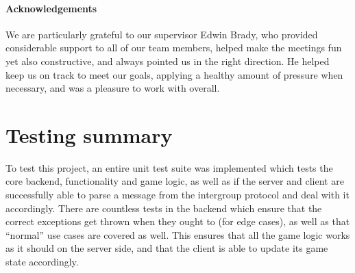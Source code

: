 \documentclass[a4paper,doc]{apa6}
\begin{document}
\begin{appendices}

\paragraph{Acknowledgements}
We are particularly grateful to our supervisor Edwin Brady, who provided considerable support to all of our team members, helped make the meetings fun yet also constructive, and always pointed us in the right direction. He helped keep us on track to meet our goals, applying a healthy amount of pressure when necessary, and was a pleasure to work with overall. 

\section{Testing summary}
To test this project, an entire unit test suite was implemented which tests the core backend, functionality and game logic, as well as if the server and client are successfully able to parse a message from the intergroup protocol and deal with it accordingly. There are countless tests in the backend which ensure that the correct exceptions get thrown when they ought to (for edge cases), as well as that “normal” use cases are covered as well. This ensures that all the game logic works as it should on the server side, and that the client is able to update its game state accordingly.


\end{appendices}
\end{document}
